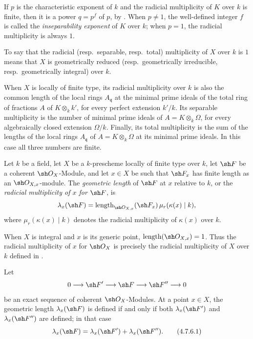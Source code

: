 If $p$ is the characteristic exponent of $k$ and the radicial
multiplicity of $K$ over $k$ is finite, then it is a power
$q=p^f$ of $p$, by .
When $p\ne1$, the well-defined integer $f$ is called the
\emph{inseparability exponent} of $K$ over $k$; when $p=1$, the
radicial multiplicity is always $1$.

To say that the radicial (resp.\ separable, resp.\ total)
multiplicity of $X$ over $k$ is $1$ means that $X$ is geometrically
reduced (resp.\ geometrically irreducible, resp.\ geometrically
integral) over $k$.

When $X$ is locally of finite type, its radicial multiplicity over
$k$ is also the common length of the local rings $A_{\mathfrak q}$ at
the minimal prime ideals of the total ring of fractions $A$ of
$K\otimes_k k'$, for every perfect extension $k'/k$.
Its separable multiplicity is the number of minimal prime ideals of
$A=K\otimes_k\Omega$, for every algebraically closed extension
$\Omega/k$.
Finally, its total multiplicity is the sum of the lengths of the local
rings $A_{\mathfrak q}$ of $A=K\otimes_k\Omega$ at its minimal prime
ideals.
In this case all three numbers are finite.

\begin{definition}[4.7.5]
\label{IV.4.7.5}
Let $k$ be a field, let $X$ be a $k$-prescheme locally of finite type
over $k$, let $\sh F$ be a coherent $\sh O_X$-Module, and let $x\in X$
be such that $\sh F_x$ has finite length as an $\sh O_{X,x}$-module.
The \emph{geometric length} of $\sh F$ at $x$ relative to $k$, or the
\emph{radicial multiplicity of $x$ for $\sh F$}, is
\[
\lambda_x(\sh F)
=\operatorname{length}_{\sh O_{X,x}}(\sh F_x)\,
 \mu_r(\kappa(x)\mid k),
\]
where $\mu_r(\kappa(x)\mid k)$ denotes the radicial multiplicity of
$\kappa(x)$ over $k$.
\end{definition}

When $X$ is integral and $x$ is its generic point,
$\operatorname{length}(\sh O_{X,x})=1$.
Thus the radicial multiplicity of $x$ for $\sh O_X$ is precisely the
radicial multiplicity of $X$ over $k$ defined in
.


\begin{proposition}[4.7.6]
\label{IV.4.7.6}
Let
\[
0\longrightarrow\sh F'\longrightarrow\sh F
\longrightarrow\sh F''\longrightarrow0
\]
be an exact sequence of coherent $\sh O_X$-Modules.
At a point $x\in X$, the geometric length $\lambda_x(\sh F)$ is
defined if and only if both $\lambda_x(\sh F')$ and
$\lambda_x(\sh F'')$ are defined; in that case
\begin{equation}
\lambda_x(\sh F)=\lambda_x(\sh F')+\lambda_x(\sh F'').
\tag{4.7.6.1}
\label{IV.4.7.6.1}
\end{equation}
\end{proposition}

